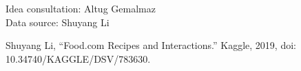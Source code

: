 \documentclass[sigconf]{acmart}
\begin{document}
%
\begin{acks}
Idea consultation: Altug Gemalmaz\\
Data source: Shuyang Li
\end{acks}


Shuyang Li, “Food.com Recipes and Interactions.” Kaggle, 2019, doi: 10.34740/KAGGLE/DSV/783630.
\end{document}
